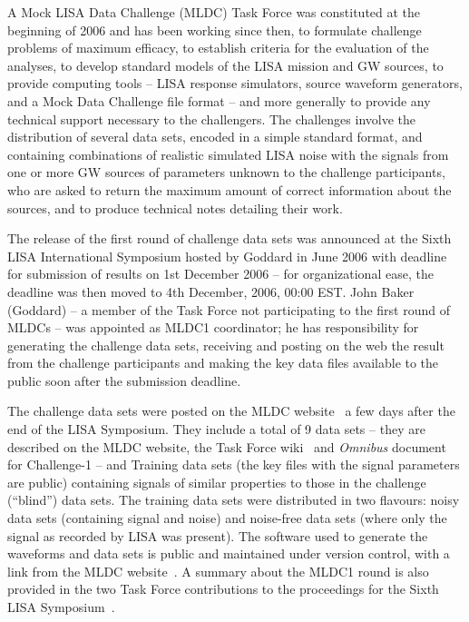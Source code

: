 \documentclass[11pt]{article}
\begin{document}
A Mock LISA Data Challenge (MLDC) Task Force was constituted at the beginning of 2006 and has been working since then, to formulate challenge problems of maximum efficacy, to establish criteria for the evaluation of the analyses, to develop standard models of the LISA mission and GW sources, to provide computing tools -- LISA response simulators, source waveform generators, and a Mock Data Challenge file format -- and more generally to provide any technical support necessary to the challengers. The challenges involve the distribution of several data sets, encoded in a simple standard format, and containing combinations of realistic simulated LISA noise with the signals from one or more GW sources of parameters unknown to the challenge participants, who are asked to return the maximum amount of correct information about the sources, and to produce technical notes detailing their work. 

The release of the first round of challenge data sets was announced at the Sixth LISA International Symposium hosted by Goddard in June 2006 with deadline for submission of results on 1st December 2006 -- for organizational ease, the deadline was then moved to 4th December, 2006, 00:00 EST. John Baker (Goddard) -- a member of the Task Force not participating to the first round of MLDCs -- was appointed as MLDC1 coordinator; he has responsibility for generating the challenge data sets, receiving and posting on the web the result from the challenge participants and making the key data files available to the public soon after the submission deadline. 

The challenge data sets were posted on the MLDC website~\cite{mldcweb} a few days after the end of the LISA Symposium. They include a total of 9 data sets -- they are described on the MLDC website, the Task Force wiki~\cite{mldcwiki} and \emph{Omnibus} document for Challenge-1 \cite{omnibus} -- and Training data sets (the key files with the signal parameters are public) containing signals of similar properties to those in the challenge (``blind'') data sets. The training data sets were distributed in two flavours: noisy data sets (containing signal and noise) and noise-free data sets (where only the signal as recorded by LISA was present). The software used to generate the waveforms and data sets is public and maintained under version control, with a link from the MLDC website~\cite{mldcweb}. A summary about the MLDC1 round is also provided in the two Task Force contributions to the proceedings for the Sixth LISA Symposium~\cite{mldcproc1,mldcproc2}. 
\end{document}
